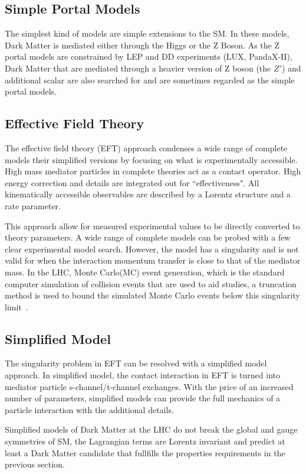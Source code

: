 \subsection{Simple Portal Models}
The simplest kind of models are simple extensions to the SM. In these models, Dark Matter is mediated either through the Higgs or the Z Boson. As the Z portal models are constrained by LEP and DD experiments (LUX, PandaX-II), Dark Matter that are mediated through a heavier version of Z boson (the $Z\prime$) and additional scalar are also searched for and are sometimes regarded as the simple portal models.

\subsection{Effective Field Theory}
\label{sec:EFT}
The effective field theory (EFT) approach condenses a wide range of complete models their simplified versions by focusing on what is experimentally accessible. High mass mediator particles in complete theories act as a contact operator. High energy correction and details are integrated out for ``effectiveness". All kinematically accessible observables are described by a Lorentz structure and a rate parameter. 

This approach allow for measured experimental values to be directly converted to theory parameters. A wide range of complete models can be probed with a few clear experimental model search. However, the model has a singularity and is not valid for when the interaction momentum transfer is close to that of the mediator mass. In the LHC, Monte Carlo(MC) event generation, which is the standard computer simulation of collision events that are used to aid studies, a truncation method is used to bound
the simulated Monte Carlo events below this singularity limit~\cite{Busoni_2014}.

\subsection{Simplified Model}
The singularity problem in EFT can be resolved with a simplified model approach. In simplified model, the contact interaction in EFT is turned into mediator particle s-channel/t-channel exchanges. With the price of an increased number of parameters, simplified models can provide the full mechanics of a particle interaction with the additional details. 

Simplified models of Dark Matter at the LHC do not break the global and gauge symmetries of SM, the Lagrangian terms are Lorentz invariant and predict at least a Dark Matter candidate that fullfills the properties requirements in the previous section. 

